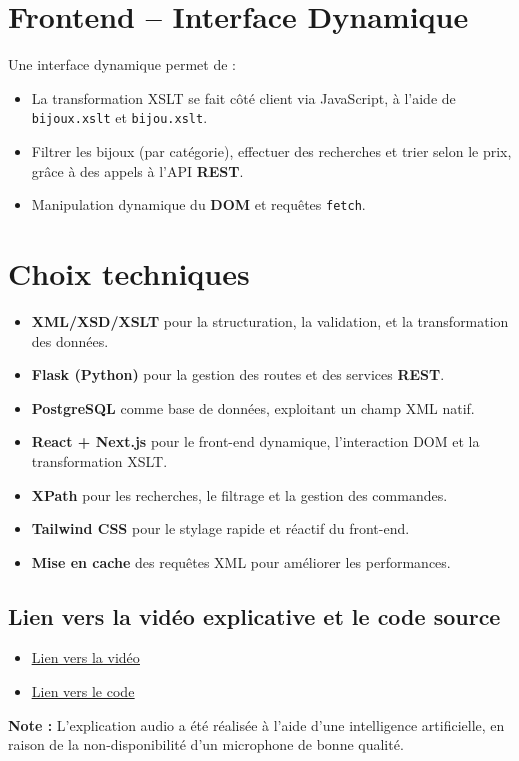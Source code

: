 \documentclass[14pt]{extarticle}
\begin{document}
\section*{Frontend – Interface Dynamique}
Une interface dynamique permet de :
\begin{itemize}[label=-]
    \item La transformation XSLT se fait côté client via JavaScript, à l’aide de \texttt{bijoux.xslt} et \texttt{bijou.xslt}.
    \item Filtrer les bijoux (par catégorie), effectuer des recherches et trier selon le prix, grâce à des appels à l’API \textbf{REST}.
    \item Manipulation dynamique du \textbf{DOM} et requêtes \texttt{fetch}.
\end{itemize}
\section*{Choix techniques}
\begin{itemize} [label =-]
    \item \textbf{XML/XSD/XSLT} pour la structuration, la validation, et la transformation des données.
    \item \textbf{Flask (Python)} pour la gestion des routes et des services \textbf{REST}.
    \item \textbf{PostgreSQL} comme base de données, exploitant un champ XML natif.
    \item \textbf{React + Next.js} pour le front-end dynamique, l’interaction DOM et la transformation XSLT.
     \item \textbf{XPath} pour les recherches, le filtrage et la gestion des commandes.
     \item \textbf{Tailwind CSS} pour le stylage rapide et réactif du front-end.
     \item \textbf{Mise en cache} des requêtes XML pour améliorer les performances.
\end{itemize}
\subsection*{ Lien vers la vidéo explicative et le code source}
\begin{itemize}[label= ]
    \item\href{https://drive.google.com/file/d/1js70yp9zMGgbiwFzuWCpGEhvx22dAf4N/view?usp=share_link}{\uline{Lien vers la vidéo}}
    \item \href{https://github.com/ikrammedj/Verron-Jewelry}{\uline{Lien vers le code}}
    
\end{itemize}
\textbf{Note :} L'explication audio a été réalisée à l'aide d'une intelligence artificielle, en raison de la non-disponibilité d’un microphone de bonne qualité.
\end{document}
